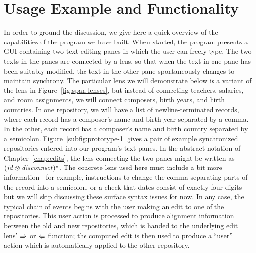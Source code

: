 \section{Usage Example and Functionality}
\label{sec:impl-usage}
In order to ground the discussion, we give here a quick overview of the
capabilities of the program we have built. When started, the program
presents a GUI containing two text-editing panes in which the user can
freely type. The two texts in the panes are connected by a lens, so that
when the text in one pane has been suitably modified, the text in the other
pane spontaneously changes to maintain synchrony. The particular lens we
will demonstrate below is a variant of the lens in
Figure~\ref{fig:span-lenses}, but instead of connecting teachers, salaries,
and room assignments, we will connect composers, birth years, and birth
countries. In one repository, we will have a list of newline-terminated
records, where each record has a composer's name and birth year separated by
a comma. In the other, each record has a composer's name and birth country
separated by a semicolon. Figure~\ref{subfig:prototype-1} gives a pair of
example synchronized repositories entered into our program's text panes. In
the abstract notation of Chapter~\ref{chap:edits}, the lens connecting the
two panes might be written as $(\mathit{id}\otimes\mathit{disconnect})^\star$. The concrete
lens used here must include a bit more information---for example,
instructions to change the comma separating parts of the record into a
semicolon, or a check that dates consist of exactly four digits---but we
will skip discussing these surface syntax issues for now. In any case, the
typical chain of events begins with the user making an edit to one of the
repositories. This user action is processed to produce alignment information
between the old and new repositories, which is handed to the underlying edit
lens' $\mathord{\Rrightarrow}$ or $\mathord{\Lleftarrow}$ function; the computed edit is then used to
produce a ``user'' action which is automatically applied to the other
repository.


